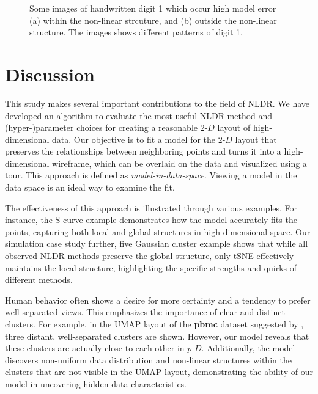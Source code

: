 \documentclass[
  12pt]{article}
\newcommand\pD{$p\text{-}D$}
\newcommand\gD{$2\text{-}D$}
\begin{document}
\begin{figure}[H]


\caption{\label{fig-mnist-anomalies}Some images of handwritten digit 1
which occur high model error (a) within the non-linear strcuture, and
(b) outside the non-linear structure. The images shows different
patterns of digit 1.}

\end{figure}%

\section{Discussion}\label{sec-discussion}

This study makes several important contributions to the field of NLDR.
We have developed an algorithm to evaluate the most useful NLDR method
and (hyper-)parameter choices for creating a reasonable \gD{} layout of
high-dimensional data. Our objective is to fit a model for the \gD{}
layout that preserves the relationships between neighboring points and
turns it into a high-dimensional wireframe, which can be overlaid on the
data and visualized using a tour. This approach is defined as
\emph{model-in-data-space}. Viewing a model in the data space is an
ideal way to examine the fit.

The effectiveness of this approach is illustrated through various
examples. For instance, the S-curve example demonstrates how the model
accurately fits the points, capturing both local and global structures
in high-dimensional space. Our simulation case study further, five
Gaussian cluster example shows that while all observed NLDR methods
preserve the global structure, only tSNE effectively maintains the local
structure, highlighting the specific strengths and quirks of different
methods.

Human behavior often shows a desire for more certainty and a tendency to
prefer well-separated views. This emphasizes the importance of clear and
distinct clusters. For example, in the UMAP layout of the \textbf{pbmc}
dataset suggested by \citet{chen2023}, three distant, well-separated
clusters are shown. However, our model reveals that these clusters are
actually close to each other in \pD{}. Additionally, the model discovers
non-uniform data distribution and non-linear structures within the
clusters that are not visible in the UMAP layout, demonstrating the
ability of our model in uncovering hidden data characteristics.
\end{document}
